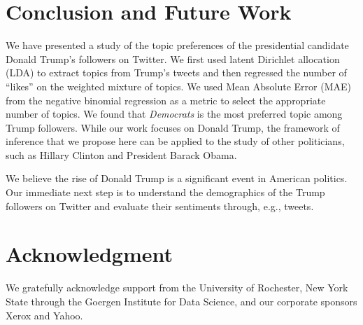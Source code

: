 \documentclass[letterpaper]{article}
\begin{document}


\section{Conclusion and Future Work}
We have presented a study of the topic preferences of the presidential candidate Donald Trump's followers on Twitter. We first used latent Dirichlet allocation (LDA) to extract topics from Trump's tweets and then regressed the number of ``likes'' on the weighted mixture of topics. We used Mean Absolute Error (MAE) from the negative binomial regression as a metric to select the appropriate number of topics. We found that \textit{Democrats} is the most preferred topic among Trump followers. While our work focuses on Donald Trump, the framework of inference that we propose here can be applied to the study of other politicians, such as Hillary Clinton and President Barack Obama.

We believe the rise of Donald Trump is a significant event in American politics. Our immediate next step is to understand the demographics of the Trump followers on Twitter and evaluate their sentiments through, e.g., tweets.

\section{Acknowledgment}
We gratefully acknowledge support from the University of Rochester, New York State through the Goergen Institute for Data Science, and our corporate sponsors Xerox and Yahoo. 
\end{document}
